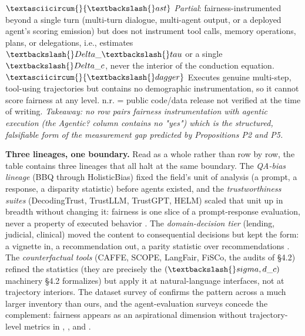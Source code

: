 \documentclass[10pt]{article}
\begin{document}
$\textasciicircum\{\}\{\textbackslash\{\}ast\}$ \emph{Partial}: fairness-instrumented beyond a single turn (multi-turn dialogue, multi-agent output, or a deployed agent's scoring emission) but does not instrument tool calls, memory operations, plans, or delegations, i.e., estimates $\textbackslash\{\}Delta\_\textbackslash\{\}tau$ or a single $\textbackslash\{\}Delta\_c$, never the interior of the conduction equation. $\textasciicircum\{\}\{\textbackslash\{\}dagger\}$ Executes genuine multi-step, tool-using trajectories but contains no demographic instrumentation, so it cannot score fairness at any level. n.r. = public code/data release not verified at the time of writing. \emph{Takeaway: no row pairs fairness instrumentation with agentic execution (the Agentic? column contains no "yes") which is the structured, falsifiable form of the measurement gap predicted by Propositions P2 and P5.}

\textbf{Three lineages, one boundary.} Read as a whole rather than row by row, the table contains three lineages that all halt at the same boundary. The \emph{QA-bias lineage} (BBQ through HolisticBias) fixed the field's unit of analysis (a prompt, a response, a disparity statistic) before agents existed, and the \emph{trustworthiness suites} (DecodingTrust, TrustLLM, TrustGPT, HELM) scaled that unit up in breadth without changing it: fairness is one slice of a prompt-response evaluation, never a property of executed behavior \cite{wang2023decodingtrust,huang2024trustllm,liang2023holistic}. The \emph{domain-decision tier} (lending, judicial, clinical) moved the content to consequential decisions but kept the form: a vignette in, a recommendation out, a parity statistic over recommendations \cite{azime2025accept,hu2025llms}. The \emph{counterfactual tools} (CAFFE, SCOPE, LangFair, FiSCo, the audits of \S{}4.2) refined the statistics (they are precisely the $(\textbackslash\{\}sigma, d\_c)$ machinery \S{}4.2 formalizes) but apply it at natural-language interfaces, not at trajectory interiors. The dataset survey of \cite{zhang2025datasets} confirms the pattern across a much larger inventory than ours, and the agent-evaluation surveys concede the complement: fairness appears as an aspirational dimension without trajectory-level metrics in \cite{mohammadi2025evaluation}, \cite{yehudai2025survey}, and \cite{chang2024survey}.
\end{document}
